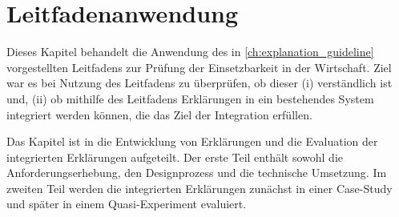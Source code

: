 \chapter{Leitfadenanwendung}
\label{sec:model_evaluation}

Dieses Kapitel behandelt die Anwendung des in \autoref{ch:explanation_guideline} vorgestellten Leitfadens zur Prüfung der Einsetzbarkeit in der Wirtschaft. Ziel war es bei Nutzung des Leitfadens zu überprüfen, ob dieser (i) verständlich ist und, (ii) ob mithilfe des Leitfadens Erklärungen in ein bestehendes System integriert werden können, die das Ziel der Integration erfüllen.

Das Kapitel ist in die Entwicklung von Erklärungen und die Evaluation der integrierten Erklärungen aufgeteilt. Der erste Teil enthält sowohl die Anforderungserhebung, den Designprozess und die technische Umsetzung. Im zweiten Teil werden die integrierten Erklärungen zunächst in einer Case-Study und später in einem Quasi-Experiment evaluiert.




